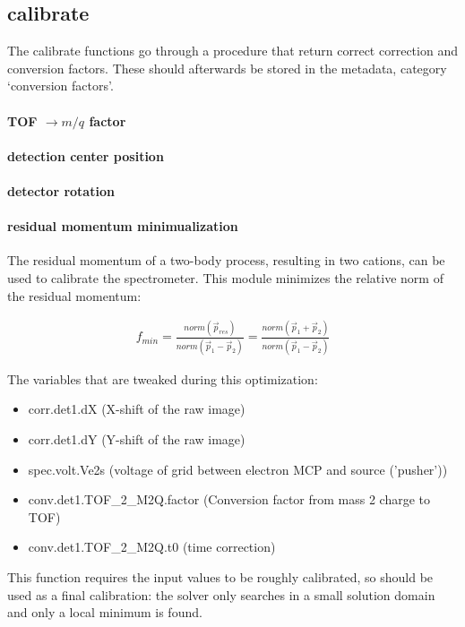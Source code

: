 \newpage
\subsection{calibrate}
The calibrate functions go through a procedure that return correct correction and conversion factors. These should afterwards be stored in the metadata, category `conversion factors'. 

\paragraph{TOF $\rightarrow m/q$ factor}

\paragraph{detection center position}

\paragraph{detector rotation}

\paragraph{residual momentum minimualization}
The residual momentum of a two-body process, resulting in two cations, can be used to calibrate the spectrometer. This module minimizes the relative norm of the residual momentum:

\begin{align}
f_{min} = \frac{norm(\vec{p}_{res})}{norm(\vec{p}_{1} - \vec{p}_{2})} = \frac{norm(\vec{p}_{1} + \vec{p}_{2})}{norm(\vec{p}_{1} - \vec{p}_{2})}
\end{align}

The variables that are tweaked during this optimization:

\begin{itemize}
\item corr.det1.dX	(X-shift of the raw image)
\item corr.det1.dY (Y-shift of the raw image)
\item spec.volt.Ve2s (voltage of grid between electron MCP and source ('pusher'))
\item conv.det1.TOF\_2\_M2Q.factor (Conversion factor from mass 2 charge to TOF) 
\item conv.det1.TOF\_2\_M2Q.t0 (time correction)
\end{itemize}

This function requires the input values to be roughly calibrated, so should be used as a final calibration: the solver only searches in a small solution domain and only a local minimum is found. 
